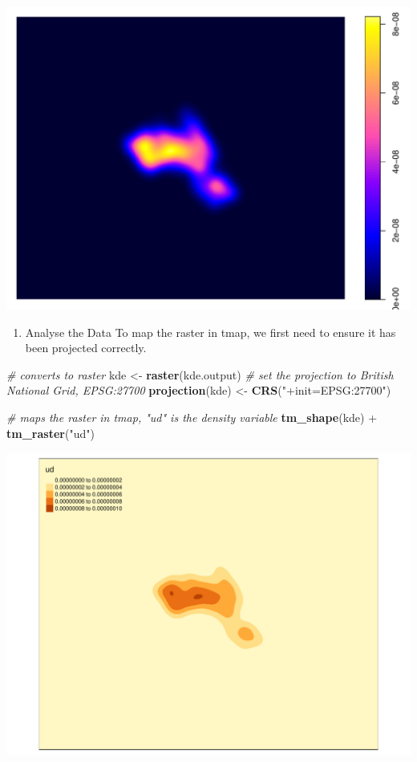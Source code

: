 \documentclass[]{article}
\newenvironment{Shaded}{}{}
\newcommand{\CommentTok}[1]{\textcolor[rgb]{0.38,0.63,0.69}{\textit{#1}}}
\newcommand{\KeywordTok}[1]{\textcolor[rgb]{0.00,0.44,0.13}{\textbf{#1}}}
\newcommand{\NormalTok}[1]{#1}
\newcommand{\OperatorTok}[1]{\textcolor[rgb]{0.40,0.40,0.40}{#1}}
\newcommand{\StringTok}[1]{\textcolor[rgb]{0.25,0.44,0.63}{#1}}
\providecommand{\tightlist}{%
  \setlength{\itemsep}{0pt}\setlength{\parskip}{0pt}}
\begin{document}
\includegraphics{TutorialNotebook_files/figure-latex/unnamed-chunk-30-1.pdf}

\begin{enumerate}
\def\labelenumi{\Roman{enumi}.}
\setcounter{enumi}{2}
\tightlist
\item
  Analyse the Data To map the raster in tmap, we first need to ensure it
  has been projected correctly.
\end{enumerate}

\begin{Shaded}
\begin{Highlighting}[]
\CommentTok{# converts to raster}
\NormalTok{kde <-}\StringTok{ }\KeywordTok{raster}\NormalTok{(kde.output)}
\CommentTok{# set the projection to British National Grid, EPSG:27700}
\KeywordTok{projection}\NormalTok{(kde) <-}\StringTok{ }\KeywordTok{CRS}\NormalTok{(}\StringTok{"+init=EPSG:27700"}\NormalTok{)}

\CommentTok{# maps the raster in tmap, "ud" is the density variable}
\KeywordTok{tm_shape}\NormalTok{(kde) }\OperatorTok{+}\StringTok{ }\KeywordTok{tm_raster}\NormalTok{(}\StringTok{"ud"}\NormalTok{)}
\end{Highlighting}
\end{Shaded}

\includegraphics{TutorialNotebook_files/figure-latex/unnamed-chunk-31-1.pdf}
\end{document}

